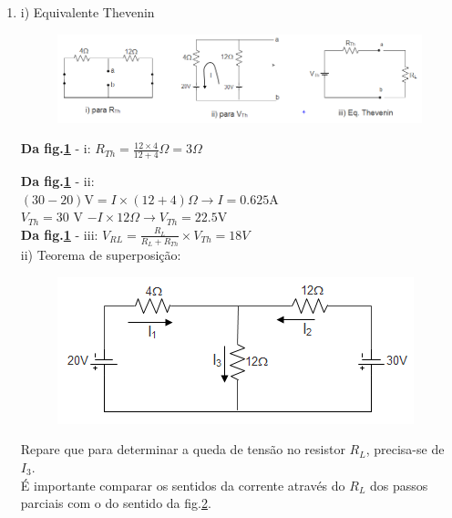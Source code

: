 \documentclass[11pt,a4paper,twoside]{report}
\begin{document}
\begin{enumerate}
\item i) Equivalente Thevenin
\begin{figure}[H]
\centering
\includegraphics[scale=0.6]{Thevenin}
\caption{}
\label{f2}
\end{figure}
\textbf{Da fig.\ref{f2}} - i: $R_{Th}=\frac{12\times4}{12+4}\Omega=3\Omega$\\
\vspace{0.3cm}

\textbf{Da fig.\ref{f2}} - ii:\\ $(30-20)$V$=I\times(12+4)\Omega \longrightarrow I=0.625$A\\
\vspace{0.3cm}
$V_{Th}=30$ V $-I\times 12\Omega \longrightarrow V_{Th}=22.5$V\\
\vspace{0.3cm}
\textbf{Da fig.\ref{f2}} - iii: $V_{RL}=\frac{R_L}{R_L+R_{Th}}\times V_{Th}=18V$\\

\vspace{0.5cm}
ii) Teorema de superposi\c c\~ao:

\noindent
\begin{minipage}[c]{6.5cm}
\begin{figure}[H]
\centering
\includegraphics[scale=0.8]{superp1}
\caption{}
\label{f3}
\end{figure}
\end{minipage}\hfill
\begin{minipage}[c]{6.5cm}
{Repare que para determinar a queda de tens\~ao no resistor $R_L$, precisa-se de $I_3$.\\
\'E importante comparar os sentidos da corrente atrav\'es do $R_L$ dos passos parciais com o do sentido da fig.\ref{f3}.}
\end{minipage}


\end{enumerate}
\end{document}
